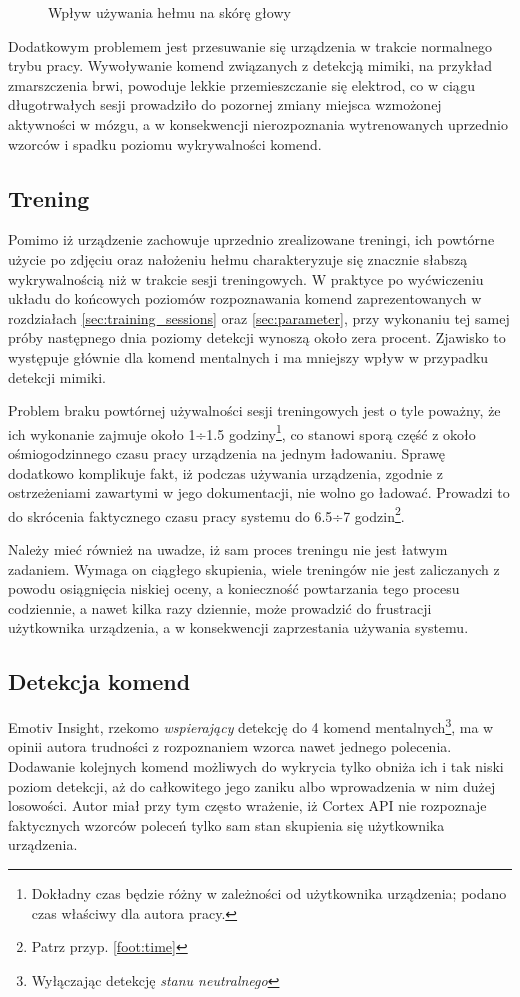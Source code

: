 \documentclass[skorowidz,skroty]{dyplomWEZUT}
\begin{document}
\begin{figure}[htb]
    \caption{Wpływ używania hełmu na skórę głowy\label{fig:headset_marks}}
\end{figure}

Dodatkowym problemem jest przesuwanie się urządzenia w trakcie normalnego trybu pracy. Wywoływanie komend związanych z detekcją mimiki, na przykład zmarszczenia brwi, powoduje lekkie przemieszczanie się elektrod, co w ciągu długotrwałych sesji prowadziło do pozornej zmiany miejsca wzmożonej aktywności w mózgu, a w konsekwencji nierozpoznania wytrenowanych uprzednio wzorców i spadku poziomu wykrywalności komend.

\subsection{Trening}
Pomimo iż urządzenie zachowuje uprzednio zrealizowane treningi, ich powtórne użycie po zdjęciu oraz nałożeniu hełmu charakteryzuje się znacznie słabszą wykrywalnością niż w trakcie sesji treningowych. W praktyce po wyćwiczeniu układu do końcowych poziomów rozpoznawania komend zaprezentowanych w rozdziałach \vref{sec:training_sessions} oraz \vref{sec:parameter}, przy wykonaniu tej samej próby następnego dnia poziomy detekcji wynoszą około zera procent. Zjawisko to występuje głównie dla komend mentalnych i ma mniejszy wpływ w przypadku detekcji mimiki.

Problem braku powtórnej używalności sesji treningowych jest o tyle poważny, że ich wykonanie zajmuje około 1÷1.5 godziny\footnote{Dokładny czas będzie różny w zależności od użytkownika urządzenia; podano czas właściwy dla autora pracy.\label{foot:time}}, co stanowi sporą część z około ośmiogodzinnego czasu pracy urządzenia na jednym ładowaniu. Sprawę dodatkowo komplikuje fakt, iż podczas używania urządzenia, zgodnie z ostrzeżeniami zawartymi w jego dokumentacji, nie wolno go ładować. Prowadzi to do skrócenia faktycznego czasu pracy systemu do 6.5÷7 godzin\footnote{Patrz przyp. \vref{foot:time}}.

Należy mieć również na uwadze, iż sam proces treningu nie jest łatwym zadaniem. Wymaga on ciągłego skupienia, wiele treningów nie jest zaliczanych z powodu osiągnięcia niskiej oceny, a konieczność powtarzania tego procesu codziennie, a nawet kilka razy dziennie, może prowadzić do frustracji użytkownika urządzenia, a w konsekwencji zaprzestania używania systemu. 

\subsection{Detekcja komend}
Emotiv Insight, rzekomo \textit{wspierający} detekcję do 4 komend mentalnych\footnote{Wyłączając detekcję \textit{stanu neutralnego}}, ma w opinii autora trudności z rozpoznaniem wzorca nawet jednego polecenia. Dodawanie kolejnych komend możliwych do wykrycia tylko obniża ich i tak niski poziom detekcji, aż do całkowitego jego zaniku albo wprowadzenia w nim dużej losowości. Autor miał przy tym często wrażenie, iż Cortex API nie rozpoznaje faktycznych wzorców poleceń tylko sam stan skupienia się użytkownika urządzenia.
\end{document}
